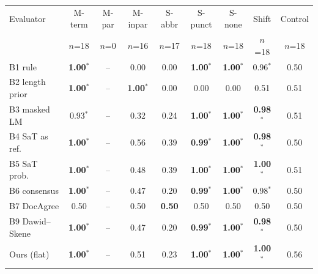 \begin{tabular}{lcccccccc}
\toprule
Evaluator & M-term & M-par & M-inpar & S-abbr & S-punct & S-none & Shift & Control \\
 & {\tiny $n$=18} & {\tiny $n$=0} & {\tiny $n$=16} & {\tiny $n$=17} & {\tiny $n$=18} & {\tiny $n$=18} & {\tiny $n$=18} & {\tiny $n$=18} \\
\midrule
B1 rule & \textbf{1.00}$^*$ & -- & 0.00 & 0.00 & \textbf{1.00}$^*$ & \textbf{1.00}$^*$ & 0.96$^*$ & 0.50 \\
B2 length prior & \textbf{1.00}$^*$ & -- & \textbf{1.00}$^*$ & 0.00 & 0.00 & 0.00 & 0.51 & 0.51 \\
B3 masked LM & 0.93$^*$ & -- & 0.32 & 0.24 & \textbf{1.00}$^*$ & \textbf{1.00}$^*$ & \textbf{0.98}$^*$ & 0.51 \\
B4 SaT as ref. & \textbf{1.00}$^*$ & -- & 0.56 & 0.39 & \textbf{0.99}$^*$ & \textbf{1.00}$^*$ & \textbf{0.98}$^*$ & 0.50 \\
B5 SaT prob. & \textbf{1.00}$^*$ & -- & 0.48 & 0.39 & \textbf{1.00}$^*$ & \textbf{1.00}$^*$ & \textbf{1.00}$^*$ & 0.51 \\
B6 consensus & \textbf{1.00}$^*$ & -- & 0.47 & 0.20 & \textbf{0.99}$^*$ & \textbf{1.00}$^*$ & 0.98$^*$ & 0.50 \\
B7 DocAgree & 0.50 & -- & 0.50 & \textbf{0.50} & 0.50 & 0.50 & 0.50 & 0.50 \\
B9 Dawid--Skene & \textbf{1.00}$^*$ & -- & 0.47 & 0.20 & \textbf{0.99}$^*$ & \textbf{1.00}$^*$ & \textbf{0.98}$^*$ & 0.50 \\
Ours (flat) & \textbf{1.00}$^*$ & -- & 0.51 & 0.23 & \textbf{1.00}$^*$ & \textbf{1.00}$^*$ & \textbf{1.00}$^*$ & 0.56 \\
\bottomrule
\end{tabular}
